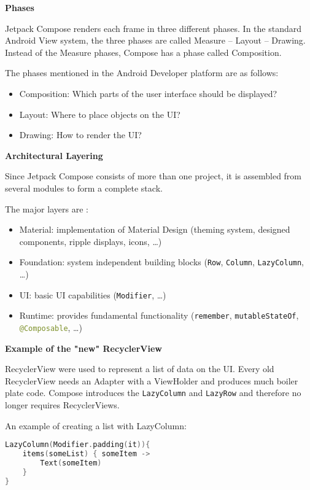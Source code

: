 \noindent
\textbf{Phases}

Jetpack Compose renders each frame in three different phases. In the standard Android View system, the three phases are called Measure -- Layout -- Drawing. Instead of the Measure phases, Compose has a phase called Composition.

The phases mentioned in the Android Developer platform \cite{android_compose_phases} are as follows:

\begin{itemize}
    \item Composition: Which parts of the user interface should be displayed?
    \item Layout: Where to place objects on the UI?
    \item Drawing: How to render the UI?  \\
\end{itemize}

\noindent
\textbf{Architectural Layering}

Since Jetpack Compose consists of more than one project, it is assembled from several modules to form a complete stack.

\noindent
The major layers are \cite{android_compose_layering}:
\begin{itemize}
    \item Material: implementation of Material Design (theming system, designed components, ripple displays, icons, \ldots)
    \item Foundation: system independent building blocks (\lstinline[language=Kotlin]|Row|, \lstinline[language=Kotlin]|Column|, \lstinline[language=Kotlin]|LazyColumn|, \ldots)
    \item UI: basic UI capabilities (\lstinline[language=Kotlin]|Modifier|, \ldots)
    \item Runtime: provides fundamental functionality (\lstinline[language=Kotlin]|remember|, \lstinline[language=Kotlin]|mutableStateOf|, \lstinline[language=Kotlin]|@Composable|, \ldots) 
\end{itemize}

\noindent
\textbf{Example of the "new" RecyclerView}

RecyclerView were used to represent a list of data on the UI. Every old RecyclerView needs an Adapter with a ViewHolder and produces much boiler plate code. Compose introduces the \lstinline[language=Kotlin]|LazyColumn| and \lstinline[language=Kotlin]|LazyRow| and therefore no longer requires RecyclerViews.

An example of creating a list with LazyColumn:

\begin{lstlisting}[language=Kotlin]
LazyColumn(Modifier.padding(it)){
    items(someList) { someItem ->
        Text(someItem)
    }
}
\end{lstlisting}